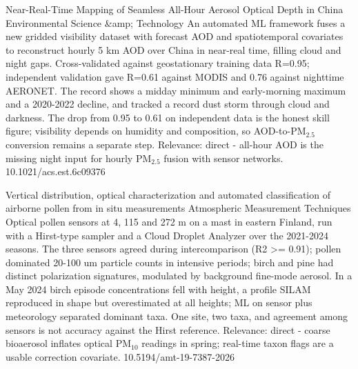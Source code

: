 \documentclass[10pt]{article}
\begin{document}
{Near-Real-Time Mapping of Seamless All-Hour Aerosol Optical Depth in China}
{Environmental Science \&amp; Technology}
{An automated ML framework fuses a new gridded visibility dataset with forecast AOD and spatiotemporal covariates to reconstruct hourly 5 km AOD over China in near-real time, filling cloud and night gaps. Cross-validated against geostationary training data R=0.95; independent validation gave R=0.61 against MODIS and 0.76 against nighttime AERONET. The record shows a midday minimum and early-morning maximum and a 2020-2022 decline, and tracked a record dust storm through cloud and darkness. The drop from 0.95 to 0.61 on independent data is the honest skill figure; visibility depends on humidity and composition, so AOD-to-PM$_{2.5}$ conversion remains a separate step. Relevance: direct - all-hour AOD is the missing night input for hourly PM$_{2.5}$ fusion with sensor networks.}
{10.1021/acs.est.6c09376}

\par{}\baselineskip{}\baselineskip
{}

{Vertical distribution, optical characterization and automated classification of airborne pollen from in situ measurements}
{Atmospheric Measurement Techniques}
{Optical pollen sensors at 4, 115 and 272 m on a mast in eastern Finland, run with a Hirst-type sampler and a Cloud Droplet Analyzer over the 2021-2024 seasons. The three sensors agreed during intercomparison (R2 >= 0.91); pollen dominated 20-100 um particle counts in intensive periods; birch and pine had distinct polarization signatures, modulated by background fine-mode aerosol. In a May 2024 birch episode concentrations fell with height, a profile SILAM reproduced in shape but overestimated at all heights; ML on sensor plus meteorology separated dominant taxa. One site, two taxa, and agreement among sensors is not accuracy against the Hirst reference. Relevance: direct - coarse bioaerosol inflates optical PM$_{10}$ readings in spring; real-time taxon flags are a usable correction covariate.}
{10.5194/amt-19-7387-2026}
\end{document}
